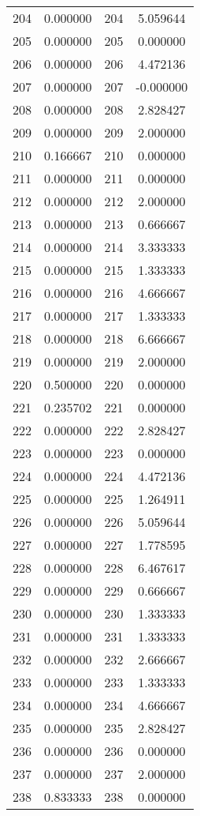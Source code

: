 \documentclass[12pt]{article}
\begin{document}
\begin{longtable}{@{}cccc@{}}
204 & 0.000000 & 204 & 5.059644 \\
205 & 0.000000 & 205 & 0.000000 \\
206 & 0.000000 & 206 & 4.472136 \\
207 & 0.000000 & 207 & -0.000000 \\
208 & 0.000000 & 208 & 2.828427 \\
209 & 0.000000 & 209 & 2.000000 \\
210 & 0.166667 & 210 & 0.000000 \\
211 & 0.000000 & 211 & 0.000000 \\
212 & 0.000000 & 212 & 2.000000 \\
213 & 0.000000 & 213 & 0.666667 \\
214 & 0.000000 & 214 & 3.333333 \\
215 & 0.000000 & 215 & 1.333333 \\
216 & 0.000000 & 216 & 4.666667 \\
217 & 0.000000 & 217 & 1.333333 \\
218 & 0.000000 & 218 & 6.666667 \\
219 & 0.000000 & 219 & 2.000000 \\
220 & 0.500000 & 220 & 0.000000 \\
221 & 0.235702 & 221 & 0.000000 \\
222 & 0.000000 & 222 & 2.828427 \\
223 & 0.000000 & 223 & 0.000000 \\
224 & 0.000000 & 224 & 4.472136 \\
225 & 0.000000 & 225 & 1.264911 \\
226 & 0.000000 & 226 & 5.059644 \\
227 & 0.000000 & 227 & 1.778595 \\
228 & 0.000000 & 228 & 6.467617 \\
229 & 0.000000 & 229 & 0.666667 \\
230 & 0.000000 & 230 & 1.333333 \\
231 & 0.000000 & 231 & 1.333333 \\
232 & 0.000000 & 232 & 2.666667 \\
233 & 0.000000 & 233 & 1.333333 \\
234 & 0.000000 & 234 & 4.666667 \\
235 & 0.000000 & 235 & 2.828427 \\
236 & 0.000000 & 236 & 0.000000 \\
237 & 0.000000 & 237 & 2.000000 \\
238 & 0.833333 & 238 & 0.000000 \\

\end{longtable}
\end{document}

